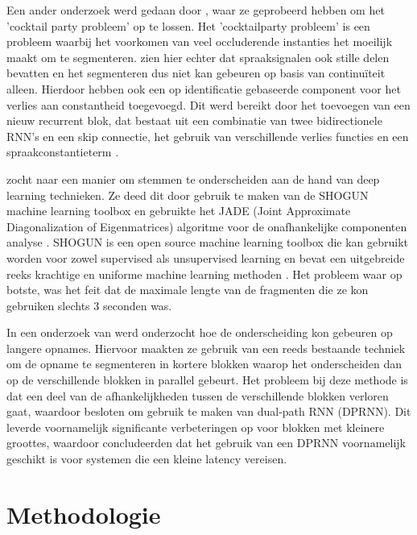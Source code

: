 Een ander onderzoek werd gedaan door \textcite{Nachmani2020}, waar ze geprobeerd hebben om het 'cocktail party probleem' op te lossen. Het 'cocktailparty probleem' is een probleem waarbij het voorkomen van veel occluderende instanties het moeilijk maakt om te segmenteren. \textcite{Nachmani2020} zien hier echter dat spraaksignalen ook stille delen bevatten en het segmenteren dus niet kan gebeuren op basis van continuïteit alleen. Hierdoor hebben \textcite{Nachmani2020} ook een op identificatie gebaseerde component voor het verlies aan constantheid toegevoegd. Dit werd bereikt door het toevoegen van een nieuw recurrent blok, dat bestaat uit een combinatie van twee bidirectionele RNN's en een skip connectie, het gebruik van verschillende verlies functies en een spraakconstantieterm \autocite{Nachmani2020}.

\textcite{Nandal2019} zocht naar een manier om stemmen te onderscheiden aan de hand van deep learning technieken. Ze deed dit door gebruik te maken van de SHOGUN machine learning toolbox en gebruikte het JADE (Joint Approximate Diagonalization of Eigenmatrices) algoritme voor de onafhankelijke componenten analyse \autocite{Nandal2019}. SHOGUN is een open source machine learning toolbox die kan gebruikt worden voor zowel supervised als unsupervised learning en bevat een uitgebreide reeks krachtige en uniforme machine learning methoden \Autocite{Nandal2019}. Het probleem waar \textcite{Nandal2019} op botste, was het feit dat de maximale lengte van de fragmenten die ze kon gebruiken slechts 3 seconden was.

In een onderzoek van \textcite{Li2021} werd onderzocht hoe de onderscheiding kon gebeuren op langere opnames. Hiervoor maakten ze gebruik van een reeds bestaande techniek om de opname te segmenteren in kortere blokken waarop het onderscheiden dan op de verschillende blokken in parallel gebeurt\autocite{Li2021}. Het probleem bij deze methode is dat een deel van de afhankelijkheden tussen de verschillende blokken verloren gaat, waardoor \textcite{Li2021} besloten om gebruik te maken van dual-path RNN (DPRNN). Dit leverde voornamelijk significante verbeteringen op voor blokken met kleinere groottes, waardoor \textcite{Li2021} concludeerden dat het gebruik van een DPRNN voornamelijk geschikt is voor systemen die een kleine latency vereisen.

\section{Methodologie}%
\label{sec:methodologie}

